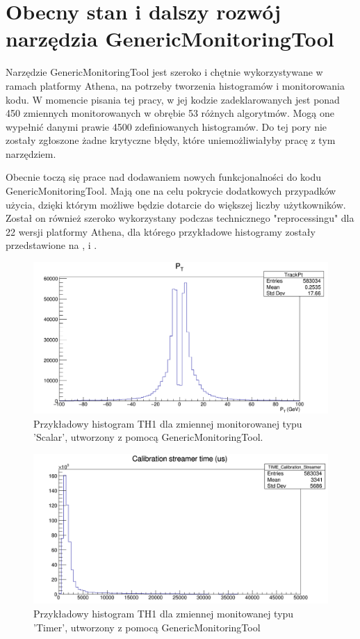 \section{Obecny stan i dalszy rozwój narzędzia GenericMonitoringTool}
Narzędzie GenericMonitoringTool jest szeroko i chętnie wykorzystywane w ramach platformy Athena, na potrzeby tworzenia histogramów i monitorowania kodu.
W momencie pisania tej pracy, w jej kodzie zadeklarowanych jest ponad 450 zmiennych monitorowanych w obrębie 53 różnych algorytmów. 
Mogą one wypełnić danymi prawie 4500 zdefiniowanych histogramów.
Do tej pory nie zostały zgłoszone żadne krytyczne błędy, które uniemożliwiałyby pracę z tym narzędziem.

Obecnie toczą się prace nad dodawaniem nowych funkcjonalności do kodu GenericMonitoringTool.
Mają one na celu pokrycie dodatkowych przypadków użycia, dzięki którym możliwe będzie dotarcie do większej liczby użytkowników. 
Został on również szeroko wykorzystany podczas technicznego "reprocessingu" dla 22 wersji platformy Athena, dla którego przykładowe histogramy zostały przedstawione na ,  i .

\begin{figure}[!ht]
\centering
\includegraphics[width=1\textwidth]{img/histogram_TH1.png}
\caption{
Przykładowy histogram TH1 dla zmiennej monitorowanej typu 'Scalar', utworzony z pomocą GenericMonitoringTool.
}
\label{fig:athena:histogram_TH1}
\end{figure}

\begin{figure}[!ht]
\centering
\includegraphics[width=1\textwidth]{img/histogram_TH1_time.png}
\caption{
Przykładowy histogram TH1 dla zmiennej monitowanej typu 'Timer', utworzony z pomocą GenericMonitoringTool 
}
\label{fig:athena:histogram_TH1_time}
\end{figure}

